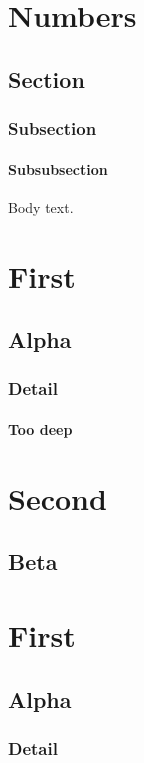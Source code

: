 \documentclass[11pt,oneside]{memoir}
\renewcommand\cftchapterfont{\sffamily}
\renewcommand\cftsectionfont{\scshape}
\renewcommand*{\cftsubsectionfont}{\hfill\itshape}
\begin{document}
\chapter{Numbers}
\section{Section}
\subsection{Subsection}
\subsubsection{Subsubsection}
Body text.
\tableofcontents*
\chapter{First}
\section{Alpha}
\subsection{Detail}
\subsubsection{Too deep}
\chapter{Second}
\section{Beta}
\tableofcontents
\chapter{First}
\section{Alpha}
\subsection{Detail}
\renewcommand\cftchapterfont{\bfseries}
\renewcommand\cftsectionfont{\normalfont}
\renewcommand*{\cftsubsectionfont}{\normalfont}
\tableofcontents
\end{document}
